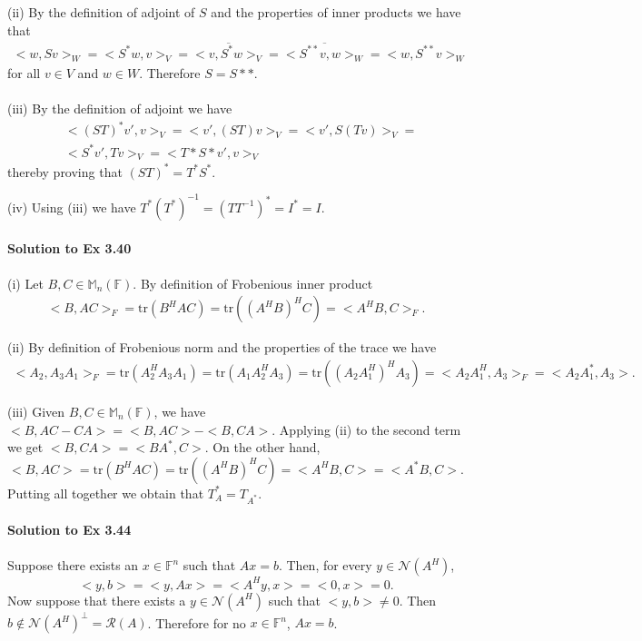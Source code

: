 \documentclass[letterpaper,12pt]{article}
\theoremstyle{definition}
\begin{document}
\begin{spacing}{1.3}{}
	(ii)
	By the definition of adjoint of $S$ and the properties of inner products we have that
	\begin{align*}
	<w,Sv>_W=<S^*w,v>_V  =
	\overline{<v,S^*w>_V}  =\overline{<S^{**}v,w>_W}  =
	<w,S^{**}v>_W
	\end{align*}
	for all $v\in V$ and $w\in W$.
	Therefore $S=S**$. \\\\
	
	(iii)
	By the definition of adjoint we have
	\begin{align*}
	&<(ST)^*v',v>_V  =<v',(ST)v>_V  =<v',S(Tv)>_V  =\\
	&<S^*v',Tv>_V  =<T*S*v',v>_V
	\end{align*}
	thereby proving that $(ST)^*=T^*S^*$.
	
	(iv)
	Using (iii) we have $T^*(T^*)^{-1}  =  (TT^{-1})^*=I^*=I$. \\\\
	
	\textbf{Solution to Ex 3.40} \\\\
	(i)
	Let $B,C\in\mathbb M_n(\mathbb F)$.
	By definition of Frobenious inner product
	\begin{align*}
	<B,AC>_F=\text{tr}(B^HAC)=\text{tr}((A^HB)^HC)=<A^HB,C>_F.
	\end{align*}
	
	(ii)
	By definition of Frobenious norm and the properties of the trace we have
	\begin{align*}
	<A_2,A_3A_1>_F=\text{tr}(A_2^HA_3A_1)=
	\text{tr}(A_1A_2^HA_3)=\text{tr}((A_2A_1^H)^HA_3)=
	<A_2A_1^H,A_3>_F=<A_2A_1^*,A_3>.
	\end{align*}
	
	(iii)
	Given $B,C\in\mathbb M_n(\mathbb F)$, we have $<B,AC-CA>=<B,AC>-<B,CA>$.
	Applying (ii) to the second term we get $<B,CA>=<BA^*,C>$.
	On the other hand,
	\begin{equation*}
	<B,AC>=\text{tr}(B^HAC)=\text{tr}((A^HB)^HC)=<A^HB,C>=<A^*B,C>.
	\end{equation*}
	Putting all together we obtain that $T_A^*=T_{A^*}$. \\\\
	
	\textbf{Solution to Ex 3.44} \\\\
	Suppose there exists an $x\in\mathbb F^n$ such that $Ax=b$.
	Then, for every $y\in\mathcal N(A^H)$,
	$$<y,b>=<y,Ax>=<A^Hy,x>=<0,x>=0.$$
	Now suppose that there exists a $y\in\mathcal N(A^H)$ such that $<y,b>\neq0$.
	Then $b\notin\mathcal N(A^H)^\perp=\mathcal R(A)$.
	Therefore for no $x\in\mathbb F^n$, $Ax=b$. \\\\
	

\end{spacing}
\end{document}
